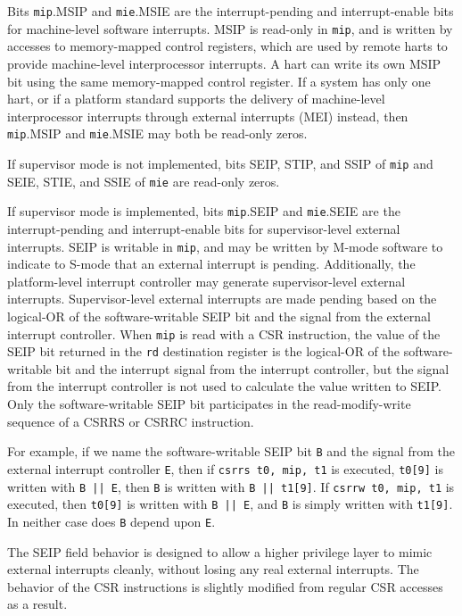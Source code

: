Bits {\tt mip}.MSIP and {\tt mie}.MSIE are the interrupt-pending and
interrupt-enable bits for machine-level software interrupts.
MSIP is read-only in {\tt mip}, and is written by accesses
to memory-mapped control registers, which are used by remote harts to
provide machine-level interprocessor interrupts.
A hart can write its
own MSIP bit using the same memory-mapped control register.
If a system has only one hart, or if a platform standard supports the
delivery of machine-level interprocessor interrupts through external
interrupts (MEI) instead, then {\tt mip}.MSIP and {\tt mie}.MSIE may
both be read-only zeros.

If supervisor mode is not implemented, bits SEIP, STIP, and SSIP of
{\tt mip} and SEIE, STIE, and SSIE of {\tt mie} are read-only zeros.

If supervisor mode is implemented, bits {\tt mip}.SEIP and {\tt mie}.SEIE
are the interrupt-pending and interrupt-enable bits for supervisor-level
external interrupts.
SEIP is writable in {\tt mip}, and
may be written by M-mode software to indicate to S-mode that an
external interrupt is pending.  Additionally, the platform-level
interrupt controller may generate supervisor-level external interrupts.
Supervisor-level external interrupts are made pending based on the
logical-OR of the software-writable SEIP bit and the signal from the
external interrupt controller.
When {\tt mip} is read with a CSR instruction,
the value of the SEIP bit returned in the {\tt rd} destination
register is the logical-OR of the software-writable bit and the
interrupt signal from the interrupt controller, but the signal from the
interrupt controller is not used to calculate the value written to SEIP.
Only the software-writable SEIP bit participates in the
read-modify-write sequence of a CSRRS or CSRRC instruction.

\begin{commentary}
  For example, if we name the software-writable SEIP bit {\tt B} and the
  signal from the external interrupt controller {\tt E}, then if \mbox{\tt csrrs
  t0, mip, t1} is executed, {\tt t0[9]} is written with \mbox{\tt B || E}, then
  {\tt B} is written with \mbox{\tt B || t1[9]}.
  If \mbox{\tt csrrw t0, mip, t1} is executed, then {\tt t0[9]} is written with
  \mbox{\tt B || E}, and {\tt B} is simply written with {\tt t1[9]}.
  In neither case does {\tt B} depend upon {\tt E}.

  The SEIP field behavior is designed to allow a higher privilege
  layer to mimic external interrupts cleanly, without losing any real
  external interrupts.  The behavior of the CSR instructions is
  slightly modified from regular CSR accesses as a result.
\end{commentary}


